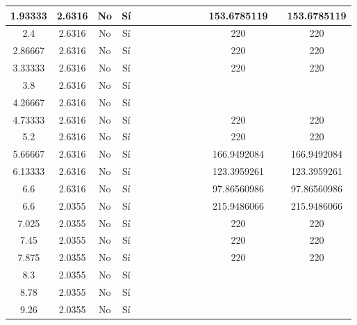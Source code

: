 \begin{table}[H]
{\begin{tabular}{|c|c|c|c|c|c|c|c|c|c|c|c|c|c|}
\hline
1.93333 & 2.6316 & No  & Sí  &     &     &     &     &     &     &     & 153.6785119 &     & 153.6785119 \bigstrut\\
\hline
2.4 & 2.6316 & No  & Sí  &     &     &     &     &     &     &     & 220 &     & 220 \bigstrut\\
\hline
2.86667 & 2.6316 & No  & Sí  &     &     &     &     &     &     &     & 220 &     & 220 \bigstrut\\
\hline
3.33333 & 2.6316 & No  & Sí  &     &     &     &     &     &     &     & 220 &     & 220 \bigstrut\\
\hline
3.8 & 2.6316 & No  & Sí  &     &     &     &     &     &     &     &     &     &  \bigstrut\\
\hline
4.26667 & 2.6316 & No  & Sí  &     &     &     &     &     &     &     &     &     &  \bigstrut\\
\hline
4.73333 & 2.6316 & No  & Sí  &     &     &     &     &     &     &     & 220 &     & 220 \bigstrut\\
\hline
5.2 & 2.6316 & No  & Sí  &     &     &     &     &     &     &     & 220 &     & 220 \bigstrut\\
\hline
5.66667 & 2.6316 & No  & Sí  &     &     &     &     &     &     &     & 166.9492084 &     & 166.9492084 \bigstrut\\
\hline
6.13333 & 2.6316 & No  & Sí  &     &     &     &     &     &     &     & 123.3959261 &     & 123.3959261 \bigstrut\\
\hline
6.6 & 2.6316 & No  & Sí  &     &     &     &     &     &     &     & 97.86560986 &     & 97.86560986 \bigstrut\\
\hline
6.6 & 2.0355 & No  & Sí  &     &     &     &     &     &     &     & 215.9486066 &     & 215.9486066 \bigstrut\\
\hline
7.025 & 2.0355 & No  & Sí  &     &     &     &     &     &     &     & 220 &     & 220 \bigstrut\\
\hline
7.45 & 2.0355 & No  & Sí  &     &     &     &     &     &     &     & 220 &     & 220 \bigstrut\\
\hline
7.875 & 2.0355 & No  & Sí  &     &     &     &     &     &     &     & 220 &     & 220 \bigstrut\\
\hline
8.3 & 2.0355 & No  & Sí  &     &     &     &     &     &     &     &     &     &  \bigstrut\\
\hline
8.78 & 2.0355 & No  & Sí  &     &     &     &     &     &     &     &     &     &  \bigstrut\\
\hline
9.26 & 2.0355 & No  & Sí  &     &     &     &     &     &     &     &     &     &  \bigstrut\\

\end{tabular}}
\end{table}
